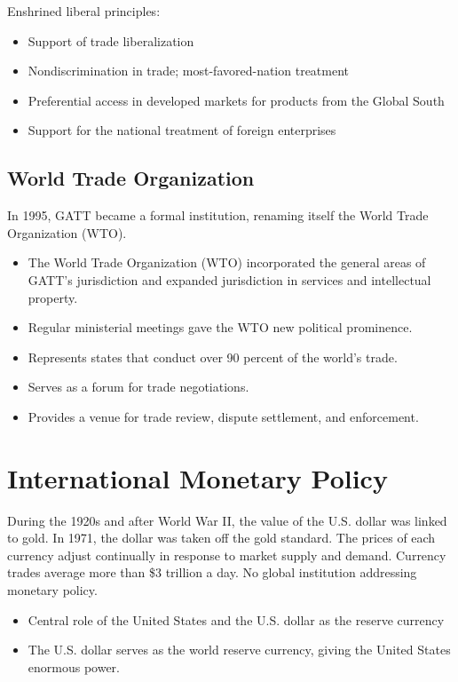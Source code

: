 \documentclass[
]{book}
\begin{document}
Enshrined liberal principles:

\begin{itemize}
\item
  Support of trade liberalization
\item
  Nondiscrimination in trade; most-favored-nation treatment
\item
  Preferential access in developed markets for products from the Global South
\item
  Support for the national treatment of foreign enterprises
\end{itemize}

\hypertarget{world-trade-organization}{%
\subsection{World Trade Organization}\label{world-trade-organization}}

In 1995, GATT became a formal institution, renaming itself the World Trade Organization (WTO).

\begin{itemize}
\item
  The World Trade Organization (WTO) incorporated the general areas of GATT's jurisdiction and expanded jurisdiction in services and intellectual property.
\item
  Regular ministerial meetings gave the WTO new political prominence.
\item
  Represents states that conduct over 90 percent of the world's trade.
\item
  Serves as a forum for trade negotiations.
\item
  Provides a venue for trade review, dispute settlement, and enforcement.
\end{itemize}

\hypertarget{international-monetary-policy}{%
\section{International Monetary Policy}\label{international-monetary-policy}}

During the 1920s and after World War II, the value of the U.S. dollar was linked to gold. In 1971, the dollar was taken off the gold standard. The prices of each currency adjust continually in response to market supply and demand. Currency trades average more than \$3 trillion a day. No global institution addressing monetary policy.

\begin{itemize}
\item
  Central role of the United States and the U.S. dollar as the reserve currency
\item
  The U.S. dollar serves as the world reserve currency, giving the United States enormous power.
\end{itemize}
\end{document}
